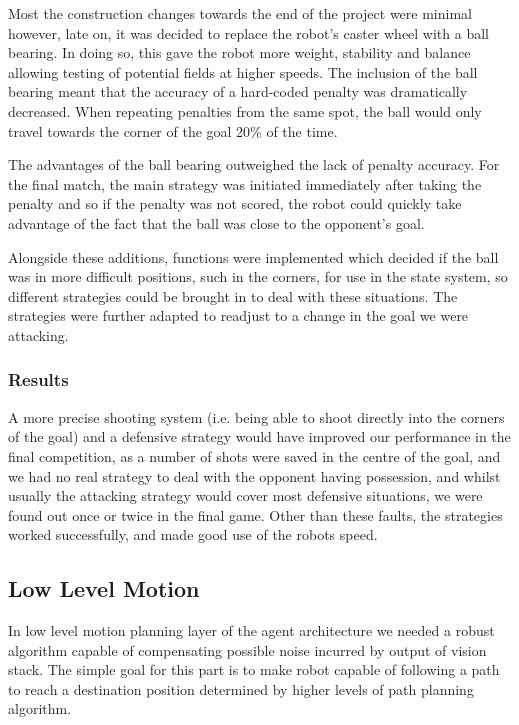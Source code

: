 Most the construction changes towards the end of the project were minimal however, late on, it was decided to replace the robot's caster wheel with a ball bearing. In doing so, this gave the robot more weight, stability and balance allowing testing of potential fields at higher speeds. The inclusion of the ball bearing meant that the accuracy of a hard-coded penalty was dramatically decreased. When repeating penalties from the same spot, the ball would only travel towards the corner of the goal 20\% of the time.\linebreak

The advantages of the ball bearing outweighed the lack of penalty accuracy. For the final match, the main strategy was initiated immediately after taking the penalty and so if the penalty was not scored, the robot could quickly take advantage of the fact that the ball was close to the opponent's goal.\linebreak

Alongside these additions, functions were implemented which decided if the ball was in more difficult positions, such in the corners, for use in the state system, so different strategies could be brought in to deal with these situations. The strategies were further adapted to readjust to a change in the goal we were attacking. \linebreak

\subsubsection{Results}
A more precise shooting system (i.e. being able to shoot directly into the corners of the goal) and a defensive strategy would have improved our performance in the final competition, as a number of shots were saved in the centre of the goal, and we had no real strategy to deal with the opponent having possession, and whilst usually the attacking strategy would cover most defensive situations, we were found out once or twice in the final game. Other than these faults, the strategies worked successfully, and made good use of the robots speed.

\subsection{Low Level Motion}
In low level motion planning layer of the agent architecture we needed a robust algorithm capable of compensating possible noise incurred by output of vision stack.  The simple goal for this part is to make robot capable of following a path to reach a destination position determined by higher levels of path planning algorithm.\linebreak

